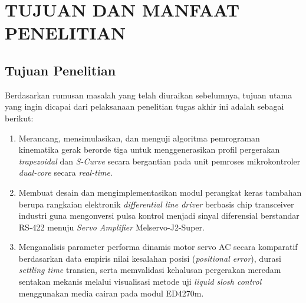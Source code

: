 \chapter{TUJUAN DAN MANFAAT PENELITIAN}
\label{bab:3}

\section{Tujuan Penelitian}
Berdasarkan rumusan masalah yang telah diuraikan sebelumnya, tujuan utama yang ingin dicapai dari pelaksanaan penelitian tugas akhir ini adalah sebagai berikut:
\begin{enumerate}
    \item Merancang, mensimulasikan, dan menguji algoritma pemrograman kinematika gerak berorde tiga untuk menggenerasikan profil pergerakan \textit{trapezoidal} dan \textit{S-Curve} secara bergantian pada unit pemroses mikrokontroler \textit{dual-core} secara \textit{real-time}.
    \item Membuat desain dan mengimplementasikan modul perangkat keras tambahan berupa rangkaian elektronik \textit{differential line driver} berbasis chip transceiver industri guna mengonversi pulsa kontrol menjadi sinyal diferensial berstandar RS-422 menuju \textit{Servo Amplifier} Melservo-J2-Super.
    \item Menganalisis parameter performa dinamis motor servo AC secara komparatif berdasarkan data empiris nilai kesalahan posisi (\textit{positional error}), durasi \textit{settling time} transien, serta memvalidasi kehalusan pergerakan meredam sentakan mekanis melalui visualisasi metode uji \textit{liquid slosh control} menggunakan media cairan pada modul ED4270m.
\end{enumerate}

